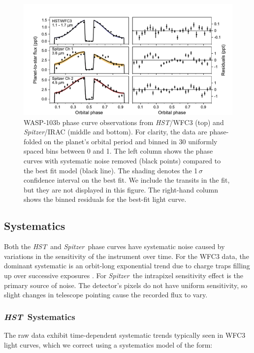 \documentclass[twocolumn]{aastex61}
\newcommand{\project}[1]{\textsl{#1}}
\newcommand{\HST}{\project{HST}}
\newcommand{\Spitzer}{\project{Spitzer}}
\begin{document}
\begin{figure}
\includegraphics[width = 1.0\textwidth]{Figures/phase_curves.pdf}
\caption{WASP-103b phase curve observations from \HST/WFC3 (top) and \Spitzer/IRAC (middle and bottom). For clarity, the data are phase-folded on the planet's orbital period and binned in 30 uniformly spaced bins between 0 and 1. The left column shows the phase curves with systematic noise removed (black points) compared to the best fit model (black line). The shading denotes the  1\,$\sigma$ confidence interval on the best fit. We include the transits in the fit, but they are not displayed in this figure. The right-hand column shows the binned residuals for the best-fit light curve.}
\label{fig:phasecurves}
\end{figure}

\subsection{Systematics}
Both the \HST\ and \Spitzer\ phase curves have systematic noise caused by variations in the sensitivity of the instrument over time. For the WFC3 data, the dominant systematic is an orbit-long exponential trend due to charge traps filling up over successive exposures \citep{zhu17}. For \Spitzer\, the intrapixel sensitivity effect is the primary source of noise. The detector's pixels do not have uniform sensitivity, so slight changes in telescope pointing cause the recorded flux to vary. 

\subsubsection{\HST\ Systematics}
The raw data exhibit time-dependent systematic trends typically seen in WFC3 light curves, which we correct using a systematics model of the form:
\end{document}
